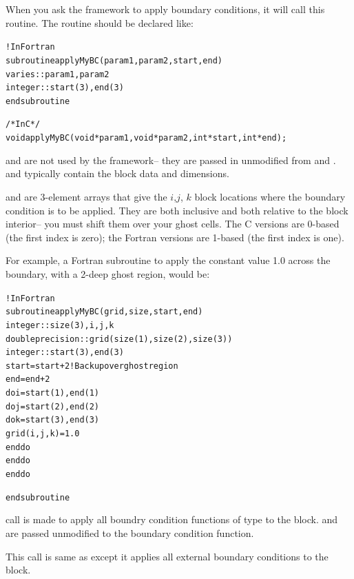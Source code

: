 \documentclass[10pt]{article}
\begin{document}
When you ask the framework to apply boundary conditions, it will call this
routine.  The routine should be declared like:

\begin{alltt}
	!In Fortran
	subroutine applyMyBC(param1,param2,start,end)
	varies :: param1, param2
	integer :: start(3), end(3)
	end subroutine

	/* In C */
	void applyMyBC(void *param1,void *param2,int *start,int *end);	
\end{alltt}
 
 and  are not used by the framework-- they are
passed in unmodified from  and .
 and  typically contain the block data and dimensions.  

 and  are 3-element arrays that give the $i$,$j$, $k$ 
block locations where the boundary condition
is to be applied.  They are both inclusive and both relative to the 
block interior-- you must shift them over your ghost cells.  The C versions
are 0-based (the first index is zero); the Fortran versions are 1-based
(the first index is one).  

For example, a Fortran subroutine to apply the constant value 1.0 across the
boundary, with a 2-deep ghost region, would be:

\begin{alltt}
	!In Fortran
	subroutine applyMyBC(grid,size,start,end)
	integer :: size(3), i,j,k
	double precision :: grid(size(1),size(2),size(3))
	integer :: start(3), end(3)
	start=start+2 ! Back up over ghost region
	end=end+2
	do i=start(1),end(1)
	do j=start(2),end(2)
	do k=start(3),end(3)
	    grid(i,j,k)=1.0
	end do
	end do
	end do

	end subroutine	
\end{alltt}


\vspace{0.2in}
 call is made to apply all boundry condition functions
of type  to the block.   and  are passed unmodified
to the boundary condition function.

\vspace{0.2in}
This call is same as  except it applies all 
external boundary conditions to the block.
\end{document}
